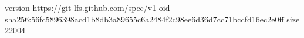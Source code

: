 version https://git-lfs.github.com/spec/v1
oid sha256:56fc5896398acd1b8db3a89655c6a2484f2c98ee6d36d7cc71bccfd16ec2e0ff
size 22004
